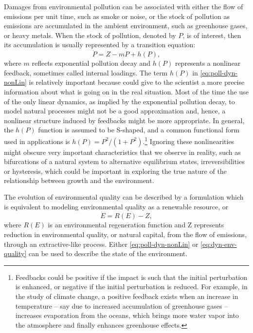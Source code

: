 Damages from environmental pollution can be associated with either the flow of emissions per unit time, such as smoke or noise, or the stock of pollution as emissions are accumulated in the ambient environment, such as greenhouse gases, or heavy metals. When the stock of pollution, denoted by $P$, is of interest, then its accumulation is usually represented by a transition equation:
\begin{equation}\label{eq:poll-dyn-nonLin}
	\dot{P} = Z - mP + h(P),
\end{equation}
where $m$ reflects exponential pollution decay and $h(P)$ represents a nonlinear feedback, sometimes called internal loadings. The term $h(P)$ in \eqref{eq:poll-dyn-nonLin} is relatively important because could give to the scientist a more precise information about what is going on in the real situation. Most of the time the use of the only linear dynamics, as implied by the exponential pollution decay, to model natural processes might not be a good approximation and, hence, a nonlinear structure induced by feedbacks might be more appropriate. In general, the $h(P)$ function is assumed to be S-shaped, and a common functional form used in applications is $h(P)=P^2 /(1+P^2)$.\footnote{Feedbacks could be positive if the impact is such that the initial perturbation is enhanced, or negative if the initial perturbation is reduced. For example, in the study of climate change, a positive feedback exists when an increase in temperature – say due to increased accumulation of greenhouse gases – increases evaporation from the oceans, which brings more water vapor into the atmosphere and finally enhances greenhouse effects.}
Ignoring these nonlinearities might obscure very important characteristics that we observe in reality, such as bifurcations of a natural system to alternative equilibrium states, irreversibilities or hysteresis, which could be important in exploring the true nature of the relationship between growth and the environment.

The evolution of environmental quality can be described by a formulation which is equivalent to modeling environmental quality as a renewable resource, or 
\begin{equation}\label{eq:dyn-env-quality}
	\dot{E}=R(E)-Z,
\end{equation}
where $R(E)$ is an environmental regeneration function and Z represents reduction in environmental quality, or natural capital, from the flow of emissions, through an extractive-like process.
Either \eqref{eq:poll-dyn-nonLin} or \eqref{eq:dyn-env-quality} can be used to describe the state of the environment.

